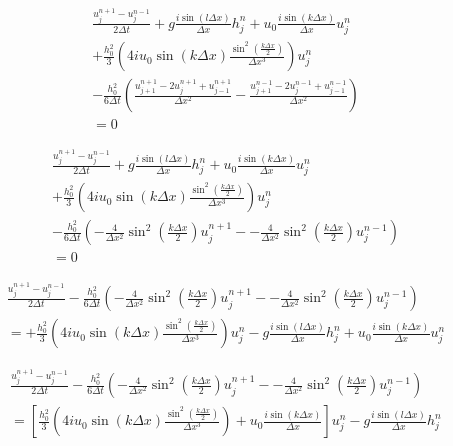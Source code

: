 \documentclass[12pt]{article}
\begin{document}
\begin{multline}
\frac{u^{n+1}_j - u^{n-1}_j}{2\Delta t} + g\frac{i \sin\left(l \Delta x\right)}{\Delta x} h^n_j + u_0\frac{i \sin\left(k \Delta x\right)}{\Delta x} u^n_j \\+ \frac{h_0^2}{3}\left(4iu_0\sin\left(k\Delta x\right)\frac{\sin^2\left(\frac{k\Delta x}{2}\right)}{\Delta x^3}\right) u^{n}_{j} \\
- \frac{h_0^2}{6 \Delta t} \left(\frac{u^{n+1}_{j+1} -2u^{n+1}_{j} +u^{n+1}_{j-1}}{\Delta x^2} -\frac{u^{n-1}_{j+1} -2u^{n-1}_{j} +u^{n-1}_{j-1}}{\Delta x^2}  \right)
\\ = 0
\end{multline}

\begin{multline}
\frac{u^{n+1}_j - u^{n-1}_j}{2\Delta t} + g\frac{i \sin\left(l \Delta x\right)}{\Delta x} h^n_j + u_0\frac{i \sin\left(k \Delta x\right)}{\Delta x} u^n_j \\+ \frac{h_0^2}{3}\left(4iu_0\sin\left(k\Delta x\right)\frac{\sin^2\left(\frac{k\Delta x}{2}\right)}{\Delta x^3}\right) u^{n}_{j}  \\
- \frac{h_0^2}{6 \Delta t} \left(-\frac{4}{\Delta x^2}\sin^2\left(\frac{k\Delta x}{2}\right) u^{n+1}_{j} - -\frac{4}{\Delta x^2}\sin^2\left(\frac{k\Delta x}{2}\right) u^{n-1}_{j}  \right)
\\ = 0
\end{multline}

\begin{multline}
\frac{u^{n+1}_j - u^{n-1}_j}{2\Delta t} 
- \frac{h_0^2}{6 \Delta t} \left(-\frac{4}{\Delta x^2}\sin^2\left(\frac{k\Delta x}{2}\right) u^{n+1}_{j} - -\frac{4}{\Delta x^2}\sin^2\left(\frac{k\Delta x}{2}\right) u^{n-1}_{j}  \right)
\\ = + \frac{h_0^2}{3}\left(4iu_0\sin\left(k\Delta x\right)\frac{\sin^2\left(\frac{k\Delta x}{2}\right)}{\Delta x^3}\right) u^{n}_{j}  - g\frac{i \sin\left(l \Delta x\right)}{\Delta x} h^n_j + u_0\frac{i \sin\left(k \Delta x\right)}{\Delta x} u^n_j
\end{multline}

\begin{multline}
\frac{u^{n+1}_j - u^{n-1}_j}{2\Delta t} 
- \frac{h_0^2}{6 \Delta t} \left(-\frac{4}{\Delta x^2}\sin^2\left(\frac{k\Delta x}{2}\right) u^{n+1}_{j} - -\frac{4}{\Delta x^2}\sin^2\left(\frac{k\Delta x}{2}\right) u^{n-1}_{j}  \right)
\\ =  \left[\frac{h_0^2}{3}\left(4iu_0\sin\left(k\Delta x\right)\frac{\sin^2\left(\frac{k\Delta x}{2}\right)}{\Delta x^3}\right) + u_0\frac{i \sin\left(k \Delta x\right)}{\Delta x} \right] u^n_j   - g\frac{i \sin\left(l \Delta x\right)}{\Delta x} h^n_j
\end{multline}
\end{document}
